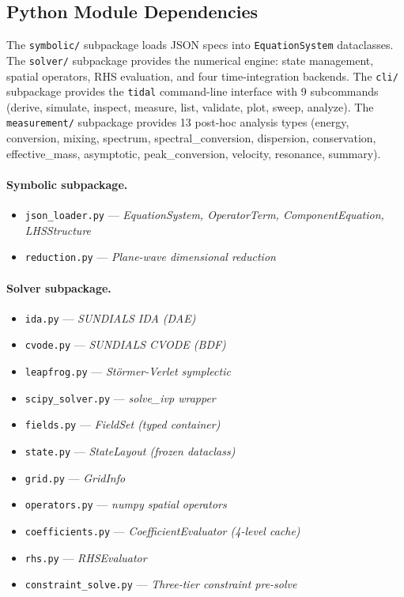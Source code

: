 \subsection{Python Module Dependencies}
\label{sec:python-module-deps}

The \texttt{symbolic/} subpackage loads JSON specs into \texttt{EquationSystem} dataclasses.
The \texttt{solver/} subpackage provides the numerical engine: state management, spatial operators, RHS evaluation, and four time-integration backends.
The \texttt{cli/} subpackage provides the \texttt{tidal} command-line interface with 9 subcommands (derive, simulate, inspect, measure, list, validate, plot, sweep, analyze).
The \texttt{measurement/} subpackage provides 13 post-hoc analysis types (energy, conversion, mixing, spectrum, spectral\_conversion, dispersion, conservation, effective\_mass, asymptotic, peak\_conversion, velocity, resonance, summary).

\paragraph{Symbolic subpackage.}
\label{par:symbolic}
\begin{itemize}
  \item \texttt{json\_loader.py} --- \emph{EquationSystem, OperatorTerm, ComponentEquation, LHSStructure}
  \item \texttt{reduction.py} --- \emph{Plane-wave dimensional reduction}
\end{itemize}

\paragraph{Solver subpackage.}
\label{par:solver}
\begin{itemize}
  \item \texttt{ida.py} --- \emph{SUNDIALS IDA (DAE)}
  \item \texttt{cvode.py} --- \emph{SUNDIALS CVODE (BDF)}
  \item \texttt{leapfrog.py} --- \emph{St\"ormer-Verlet symplectic}
  \item \texttt{scipy\_solver.py} --- \emph{solve\_ivp wrapper}
  \item \texttt{fields.py} --- \emph{FieldSet (typed container)}
  \item \texttt{state.py} --- \emph{StateLayout (frozen dataclass)}
  \item \texttt{grid.py} --- \emph{GridInfo}
  \item \texttt{operators.py} --- \emph{numpy spatial operators}
  \item \texttt{coefficients.py} --- \emph{CoefficientEvaluator (4-level cache)}
  \item \texttt{rhs.py} --- \emph{RHSEvaluator}
  \item \texttt{constraint\_solve.py} --- \emph{Three-tier constraint pre-solve}
\end{itemize}

